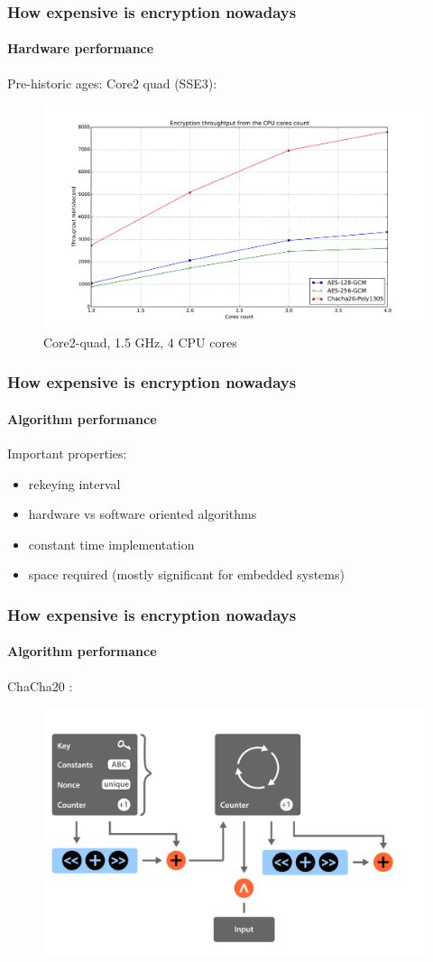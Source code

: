 \documentclass[11pt,t]{beamer}
\newcommand{\cipher}[1]{
	{\color{blue!30} #1}
}
\begin{document}
\begin{frame}
\frametitle{How expensive is encryption nowadays}
\framesubtitle{Hardware performance}
Pre-historic ages: Core2 quad (SSE3):
\begin{figure}[H]
\includegraphics[height=0.6\textheight]{perf-c2.pdf}
\caption{Core2-quad, 1.5 GHz, 4 CPU cores}
\end{figure}
\end{frame}

\begin{frame}
\frametitle{How expensive is encryption nowadays}
\framesubtitle{Algorithm performance}
Important properties:
	\begin{itemize}
	\item rekeying interval
	\item hardware vs software oriented algorithms
	\item constant time implementation
	\item space required (mostly significant for embedded systems)
	\end{itemize}
\end{frame}

\begin{frame}
\frametitle{How expensive is encryption nowadays}
\framesubtitle{Algorithm performance} 
\cipher{ChaCha20}:
\begin{figure}[H]
\includegraphics[height=0.7\textheight]{chacha.pdf}
\end{figure}
\end{frame}
\end{document}
